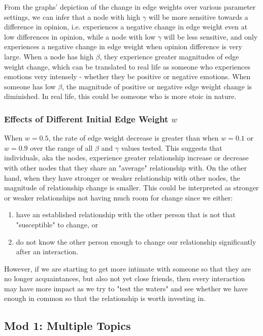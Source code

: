 \documentclass[11pt]{article}
\begin{document}
From the graphs' depiction of the change in edge weights over various
parameter settings, we can infer that a node with high \(\gamma\) will
be more sensitive towards a difference in opinion, i.e. experiences a
negative change in edge weight even at low differences in opinion, while
a node with low \(\gamma\) will be less sensitive, and only experiences
a negative change in edge weight when opinion difference is very large.
When a node has high \(\beta\), they experience greater magnitudes of
edge weight change, which can be translated to real life as someone who
experiences emotions very intensely - whether they be positive or
negative emotions. When someone has low \(\beta\), the magnitude of
positive or negative edge weight change is diminished. In real life,
this could be someone who is more stoic in nature.

\subsubsection{Effects of Different Initial Edge Weight \(w\)}

When \(w=0.5\), the rate of edge weight decrease is greater than when
\(w=0.1\) or \(w=0.9\) over the range of all \(\beta\) and \(\gamma\)
values tested. This suggests that individuals, aka the nodes, experience
greater relationship increase or decrease with other nodes that they
share an "average" relationship with. On the other hand, when they have
stronger or weaker relationship with other nodes, the magnitude of
relationship change is smaller. This could be interpreted as stronger or
weaker relationships not having much room for change since we either:

\begin{enumerate}
\def\labelenumi{\alph{enumi})}
\item
  have an established relationship with the other person that is not
  that "susceptible" to change, or
\item
  do not know the other person enough to change our relationship
  significantly after an interaction.
\end{enumerate}

However, if we are starting to get more intimate with someone so that
they are no longer acquaintances, but also not yet close friends, then
every interaction may have more impact as we try to "test the waters"
and see whether we have enough in common so that the relationship is
worth investing in.

    \subsection{Mod 1: Multiple Topics}
\end{document}
